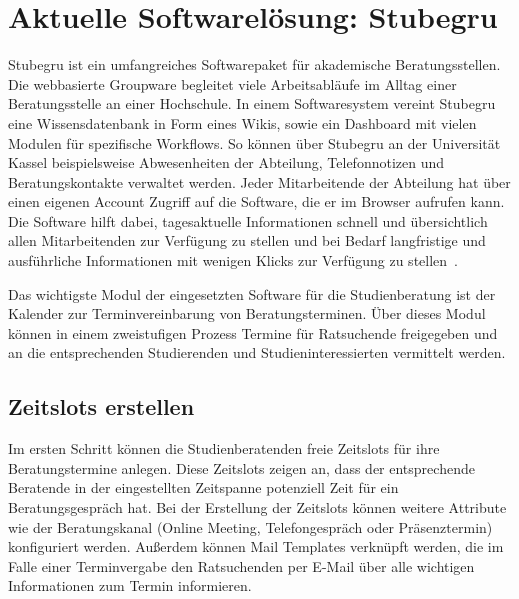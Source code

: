 \section{Aktuelle Softwarelösung: Stubegru}
Stubegru ist ein umfangreiches Softwarepaket für akademische Beratungsstellen.
Die webbasierte Groupware begleitet viele Arbeitsabläufe im Alltag einer
Beratungsstelle an einer Hochschule. In einem Softwaresystem vereint Stubegru
eine Wissensdatenbank in Form eines Wikis, sowie ein Dashboard mit vielen
Modulen für spezifische Workflows. So können über Stubegru an der Universität
Kassel beispielsweise Abwesenheiten der Abteilung, Telefonnotizen und
Beratungskontakte verwaltet werden. Jeder Mitarbeitende der Abteilung hat über
einen eigenen Account Zugriff auf die Software, die er im Browser aufrufen
kann. Die Software hilft dabei, tagesaktuelle Informationen schnell und
übersichtlich allen Mitarbeitenden zur Verfügung zu stellen und bei Bedarf
langfristige und ausführliche Informationen mit wenigen Klicks zur Verfügung zu
stellen~\cite{stubegruWebsite}.

Das wichtigste Modul der eingesetzten Software für die Studienberatung ist der
Kalender zur Terminvereinbarung von Beratungsterminen. Über dieses Modul können
in einem zweistufigen Prozess Termine für Ratsuchende freigegeben und an die
entsprechenden Studierenden und Studieninteressierten vermittelt werden.

\subsection*{Zeitslots erstellen}
Im ersten Schritt können die Studienberatenden freie Zeitslots für ihre
Beratungstermine anlegen. Diese Zeitslots zeigen an, dass der entsprechende
Beratende in der eingestellten Zeitspanne potenziell Zeit für ein
Beratungsgespräch hat. Bei der Erstellung der Zeitslots können weitere
Attribute wie der Beratungskanal (Online Meeting, Telefongespräch oder
Präsenztermin) konfiguriert werden. Außerdem können Mail Templates verknüpft
werden, die im Falle einer Terminvergabe den Ratsuchenden per E-Mail über alle
wichtigen Informationen zum Termin informieren.

